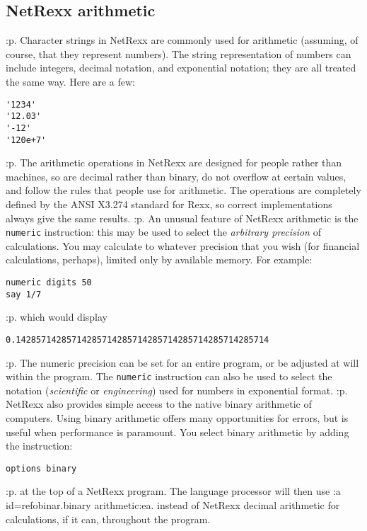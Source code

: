 \subsection{NetRexx arithmetic}\label{refoarith}
:p.
Character strings in NetRexx are commonly used for arithmetic (assuming,
of course, that they represent numbers).  The string representation of
numbers can include integers, decimal notation, and exponential
notation; they are all treated the same way.  Here are a few:
\begin{verbatim}
'1234'
'12.03'
'-12'
'120e+7'
\end{verbatim}
:p.
The arithmetic operations in NetRexx are designed for people rather than
machines, so are decimal rather than binary, do not overflow at certain
values, and follow the rules that people use for arithmetic.
The operations are completely defined by the ANSI X3.274 standard for
Rexx, so correct implementations always give the same results.
:p.
An unusual feature of NetRexx arithmetic is the \texttt{numeric}
instruction: this may be used to select the \emph{arbitrary
precision} of calculations.  You may calculate to whatever
precision that you wish (for financial calculations, perhaps), limited
only by available memory.  For example:
\begin{verbatim}
numeric digits 50
say 1/7
\end{verbatim}
:p.
which would display
\begin{verbatim}
0.14285714285714285714285714285714285714285714285714
\end{verbatim}
:p.
The numeric precision can be set for an entire program, or be adjusted
at will within the program.  The \texttt{numeric}  instruction can also
be used to select the notation (\emph{scientific}
or \emph{engineering}) used for numbers in exponential format.
:p.
NetRexx also provides simple access to the native binary arithmetic of
computers.  Using binary arithmetic offers many opportunities for
errors, but is useful when performance is paramount.  You select binary
arithmetic by adding the instruction:
\begin{verbatim}
options binary
\end{verbatim}
:p.
at the top of a NetRexx program.  The language processor will then use
:a id=refobinar.binary arithmetic:ea. instead of NetRexx decimal
arithmetic for calculations, if it can, throughout the program.
